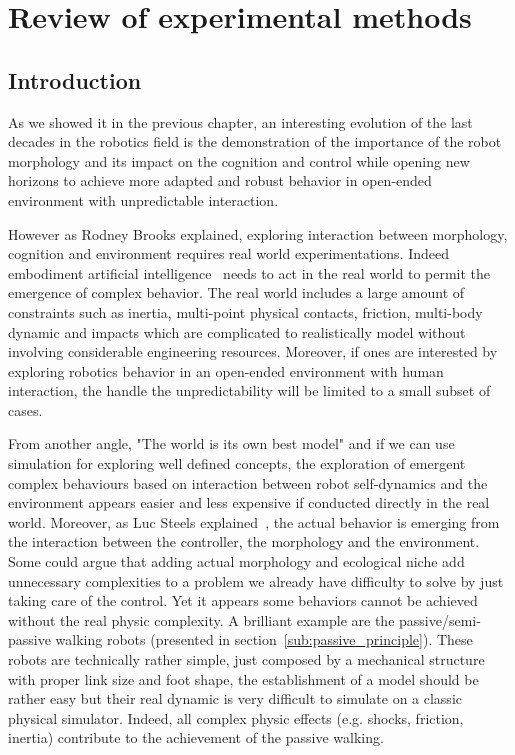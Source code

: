 
% 
\chapter{Review of experimental methods} %
\label{cha:experimental-methods}



\section{Introduction} %

As we showed it in the previous chapter, an interesting evolution of the last decades in the robotics field is the demonstration of the importance of the robot morphology and its impact on the cognition and control while opening new horizons to achieve more adapted and robust behavior in open-ended environment with unpredictable interaction.

However as Rodney Brooks explained, exploring interaction between morphology, cognition and environment requires real world experimentations. Indeed embodiment artificial intelligence~\parencite{Pfeifer07} needs to act in the real world to permit the emergence of complex behavior. The real world includes a large amount of constraints such as inertia, multi-point physical contacts, friction, multi-body dynamic and impacts which are complicated to realistically model without involving considerable engineering resources. Moreover, if ones are interested by exploring robotics behavior in an open-ended environment with human interaction, the handle the unpredictability will be limited to a small subset of cases.

From another angle, "The world is its own best model" and if we can use simulation for exploring well defined concepts, the exploration of emergent complex behaviours based on interaction between robot self-dynamics and the environment appears easier and less expensive if conducted directly in the real world.
Moreover, as Luc Steels explained~\parencite{Steels1991emergence}, the actual behavior is emerging from the interaction between the controller, the morphology and the environment. Some could argue that adding actual morphology and ecological niche add unnecessary complexities to a problem we already have difficulty to solve by just taking care of the control. Yet it appears some behaviors cannot be achieved without the real physic complexity. A brilliant example are the passive/semi-passive walking robots (presented in section~\ref{sub:passive_principle}). These robots are technically rather simple, just composed by a mechanical structure with proper link size and foot shape, the establishment of a model should be rather easy but their real dynamic is very difficult to simulate on a classic physical simulator. Indeed, all complex physic effects (e.g. shocks, friction, inertia) contribute to the achievement of the passive walking.

